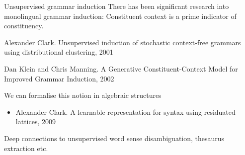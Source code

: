 \documentclass{beamer}
\newenvironment{unpacked_itemize}{
\begin{itemize}
  \setlength{\itemsep}{10pt}
  \setlength{\parskip}{0pt}
  \setlength{\parsep}{0pt}
}{\end{itemize}}
\begin{document}
\begin{frame}[t]{Unsupervised grammar induction}
There has been significant research into monolingual grammar induction:
\vspace{0.1in}
\alert{Constituent context is a prime indicator of constituency.}
\begin{unpacked_itemize}
\item Alexander Clark. Unsupervised induction of stochastic context-free grammars using distributional clustering, 2001
\item Dan Klein and Chris Manning. A Generative Constituent-Context Model for Improved Grammar Induction, 2002
\end{unpacked_itemize}
\vspace{0.1in}
\alert{We can formalise this notion in algebraic structures}
\begin{itemize}
\item Alexander Clark. A learnable representation for syntax using residuated lattices, 2009
\end{itemize}
\vspace{0.1in}
Deep connections to unsupervised word sense disambiguation, thesaurus extraction etc.
\end{frame}

%
%
\end{document}
